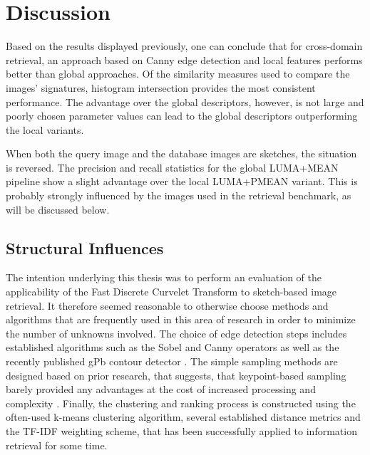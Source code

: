\chapter{Discussion}\label{ch:discussion}


Based on the results displayed previously, one can conclude that for
cross-domain retrieval, an approach based on Canny edge detection and local
features performs better than global approaches. Of the similarity measures
used to compare the images' signatures, histogram intersection provides the
most consistent performance. 
The advantage over the global descriptors, however, is not large and poorly
chosen parameter values can lead to the global descriptors outperforming the
local variants.

When both the query image and the database images are sketches, the situation
is reversed. The precision and recall statistics for the global LUMA+MEAN
pipeline show a slight advantage over the local LUMA+PMEAN variant. This is
probably strongly influenced by the images used in the retrieval benchmark, as
will be discussed below.

\section{Structural Influences}

The intention underlying this thesis was to perform an evaluation of the
applicability of the Fast Discrete Curvelet Transform to sketch-based image
retrieval. It therefore seemed reasonable to otherwise choose methods and
algorithms that are frequently used in this area of research in order to
minimize the number of unknowns involved. The choice of edge detection steps
includes established algorithms such as the Sobel and Canny operators as well
as the recently published gPb contour detector
\autocite{arbelaez_contour_2011}. The simple sampling methods are designed
based on prior research, that suggests, that keypoint-based sampling barely
provided any advantages at the cost of increased processing and complexity
\autocite{nowak_sampling_2006}. Finally, the clustering and ranking process is
constructed using the often-used k-means clustering algorithm, several
established distance metrics and the TF-IDF weighting scheme, that has been
successfully applied to information retrieval for some time.

